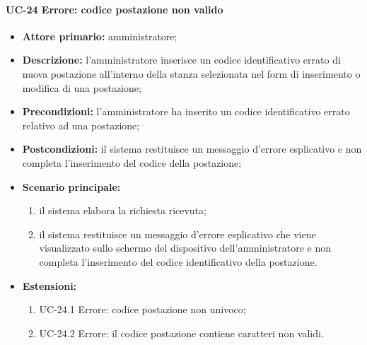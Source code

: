 \paragraph{UC-24 Errore: codice postazione non valido}
\begin{itemize}
	\item \textbf{Attore primario:} amministratore;
	\item \textbf{Descrizione:} l'amministratore inserisce un codice identificativo errato di nuova postazione all'interno della stanza selezionata nel form di inserimento o modifica di una postazione;
	\item \textbf{Precondizioni:} l'amministratore ha inserito un codice identificativo errato relativo ad una postazione;
	\item \textbf{Postcondizioni:} il sistema restituisce un messaggio d'errore esplicativo e non completa l'inserimento del codice della postazione;
	\item \textbf{Scenario principale:}
	      \begin{enumerate}
		      \item il sistema elabora la richiesta ricevuta;
		      \item il sistema restituisce un messaggio d'errore esplicativo che viene visualizzato sullo schermo del dispositivo dell'amministratore e non completa l'inserimento del codice identificativo della postazione.
	      \end{enumerate}
	 \item \textbf{Estensioni:}
	 	\begin{enumerate}
		       \item UC-24.1 Errore: codice postazione non univoco;
		       \item UC-24.2 Errore: il codice postazione contiene caratteri non validi.
	        \end{enumerate}
\end {itemize}

